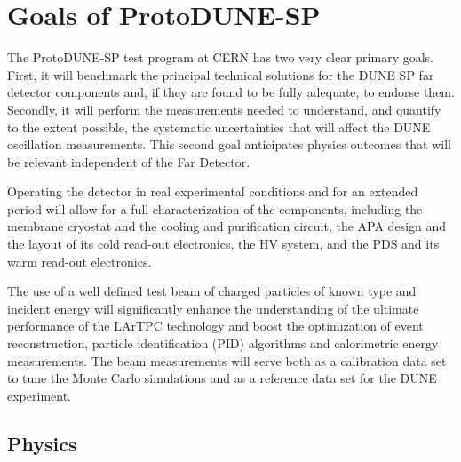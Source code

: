 \section{Goals of ProtoDUNE-SP}


The ProtoDUNE-SP test program at CERN has two very clear primary goals. First, it will benchmark the principal technical solutions for the DUNE SP far detector components and, if they are found to be fully adequate, to endorse them. Secondly, it will perform the measurements needed to understand, and quantify to the extent possible, the systematic uncertainties that will affect the DUNE oscillation measurements. This second goal anticipates physics outcomes that will be relevant independent of the Far Detector.

Operating the detector in real experimental conditions and for an extended period will allow for a full characterization of the components, including the membrane cryostat and the cooling and purification circuit, the APA design and the layout of its cold read-out electronics, the HV system, and the PDS and its warm read-out electronics.

The use of a well defined test beam of charged particles of known type and incident  energy will significantly enhance the understanding of the ultimate performance of the LArTPC technology and boost the optimization of event reconstruction, particle identification (PID) algorithms and calorimetric energy measurements.  The beam measurements will serve both as a calibration data set to tune the Monte Carlo simulations and as a reference data set for the DUNE experiment. 

\subsection{Physics}

